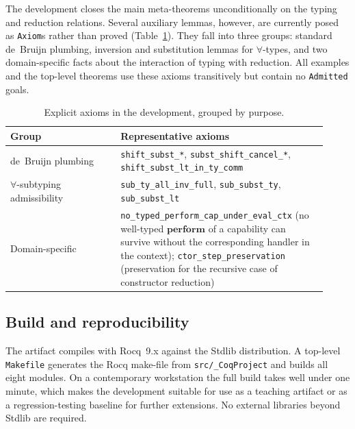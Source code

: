 \documentclass[12pt,a4paper]{article}
\newcommand{\keyword}[1]{\mathbf{#1}}
\begin{document}
    The development closes the main meta-theorems unconditionally on the typing and
    reduction relations.
    Several auxiliary lemmas, however, are currently posed as \texttt{Axiom}s rather
    than proved (Table~\ref{tab:axioms}).
    They fall into three groups: standard de~Bruijn plumbing, inversion and substitution
    lemmas for $\forall$-types, and two domain-specific facts about the interaction of
    typing with reduction.
    All examples and the top-level theorems use these axioms transitively but contain
    no \texttt{Admitted} goals.

    \begin{table}[h]
        \centering
        \small
        \caption{Explicit axioms in the development, grouped by purpose.}
        \label{tab:axioms}
        \begin{tabular}{@{}p{0.32\linewidth}p{0.60\linewidth}@{}}
            \toprule
            \textbf{Group} & \textbf{Representative axioms} \\
            \midrule
            de~Bruijn plumbing &
                \texttt{shift\_subst\_*}, \texttt{subst\_shift\_cancel\_*},
                \texttt{shift\_subst\_lt\_in\_ty\_comm} \\[0.3em]
            $\forall$-subtyping admissibility &
                \texttt{sub\_ty\_all\_inv\_full},
                \texttt{sub\_subst\_ty},
                \texttt{sub\_subst\_lt} \\[0.3em]
            Domain-specific &
                \texttt{no\_typed\_perform\_cap\_under\_eval\_ctx} (no well-typed
                $\keyword{perform}$ of a capability can survive without the
                corresponding handler in the context); \texttt{ctor\_step\_preservation}
                (preservation for the recursive case of constructor reduction) \\
            \bottomrule
        \end{tabular}
    \end{table}

    \subsection{Build and reproducibility}

    The artifact compiles with Rocq~9.x against the Stdlib distribution.
    A top-level \texttt{Makefile} generates the Rocq make-file from \texttt{src/\_CoqProject}
    and builds all eight modules.
    On a contemporary workstation the full build takes well under one minute, which makes
    the development suitable for use as a teaching artifact or as a regression-testing
    baseline for further extensions.
    No external libraries beyond Stdlib are required.
\end{document}
